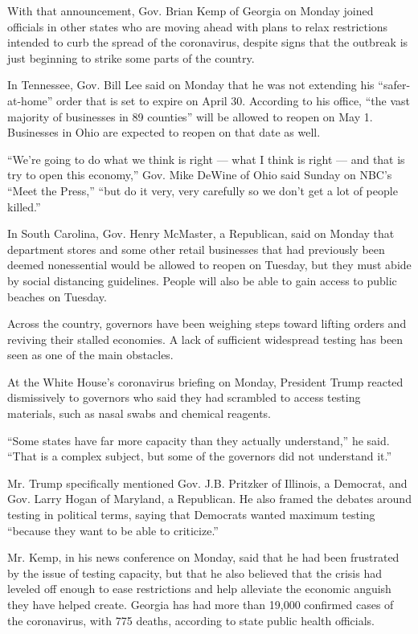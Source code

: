 With that announcement, Gov. Brian Kemp of Georgia on Monday joined
officials in other states who are moving ahead with plans to relax
restrictions intended to curb the spread of the coronavirus, despite
signs that the outbreak is just beginning to strike some parts of the
country.

In Tennessee, Gov. Bill Lee said on Monday that he was not extending his
``safer-at-home'' order that is set to expire on April 30. According to
his office, ``the vast majority of businesses in 89 counties'' will be
allowed to reopen on May 1. Businesses in Ohio are expected to reopen on
that date as well.

``We're going to do what we think is right --- what I think is right ---
and that is try to open this economy,'' Gov. Mike DeWine of Ohio said
Sunday on NBC's ``Meet the Press,'' ``but do it very, very carefully so
we don't get a lot of people killed.''

In South Carolina, Gov. Henry McMaster, a Republican, said on Monday
that department stores and some other retail businesses that had
previously been deemed nonessential would be allowed to reopen on
Tuesday, but they must abide by social distancing guidelines. People
will also be able to gain access to public beaches on Tuesday.

Across the country, governors have been weighing steps toward lifting
orders and reviving their stalled economies. A lack of sufficient
widespread testing has been seen as one of the main obstacles.

At the White House's coronavirus briefing on Monday, President Trump
reacted dismissively to governors who said they had scrambled to access
testing materials, such as nasal swabs and chemical reagents.

``Some states have far more capacity than they actually understand,'' he
said. ``That is a complex subject, but some of the governors did not
understand it.''

Mr. Trump specifically mentioned Gov. J.B. Pritzker of Illinois, a
Democrat, and Gov. Larry Hogan of Maryland, a Republican. He also framed
the debates around testing in political terms, saying that Democrats
wanted maximum testing ``because they want to be able to criticize.''

Mr. Kemp, in his news conference on Monday, said that he had been
frustrated by the issue of testing capacity, but that he also believed
that the crisis had leveled off enough to ease restrictions and help
alleviate the economic anguish they have helped create. Georgia has had
more than 19,000 confirmed cases of the coronavirus, with 775 deaths,
according to state public health officials.

